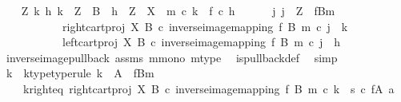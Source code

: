 \begin{isabellebody}
\isanewline
\ \ \isamarkupfalse%
\ {\isachardoublequoteopen}{\isasymAnd}Z\ k\ h{\isachardot}{\kern0pt}\ k\ {\isacharcolon}{\kern0pt}\ Z\ {\isasymrightarrow}\ B\ {\isasymLongrightarrow}\ h\ {\isacharcolon}{\kern0pt}\ Z\ {\isasymrightarrow}\ X\ {\isasymLongrightarrow}\ m\ {\isasymcirc}\isactrlsub c\ k\ {\isacharequal}{\kern0pt}\ f\ {\isasymcirc}\isactrlsub c\ h\ {\isasymLongrightarrow}\isanewline
\ \ \ \ \ {\isacharparenleft}{\kern0pt}{\isasymexists}{\isacharbang}{\kern0pt}j{\isachardot}{\kern0pt}\ j\ {\isacharcolon}{\kern0pt}\ Z\ {\isasymrightarrow}\ f\isactrlsup {\isacharminus}{\kern0pt}B{\isasymrparr}\isactrlbsub m\isactrlesub \ {\isasymand}\isanewline
\ \ \ \ \ \ \ \ \ \ \ {\isacharparenleft}{\kern0pt}right{\isacharunderscore}{\kern0pt}cart{\isacharunderscore}{\kern0pt}proj\ X\ B\ {\isasymcirc}\isactrlsub c\ inverse{\isacharunderscore}{\kern0pt}image{\isacharunderscore}{\kern0pt}mapping\ f\ B\ m{\isacharparenright}{\kern0pt}\ {\isasymcirc}\isactrlsub c\ j\ {\isacharequal}{\kern0pt}\ k\ {\isasymand}\isanewline
\ \ \ \ \ \ \ \ \ \ \ {\isacharparenleft}{\kern0pt}left{\isacharunderscore}{\kern0pt}cart{\isacharunderscore}{\kern0pt}proj\ X\ B\ {\isasymcirc}\isactrlsub c\ inverse{\isacharunderscore}{\kern0pt}image{\isacharunderscore}{\kern0pt}mapping\ f\ B\ m{\isacharparenright}{\kern0pt}\ {\isasymcirc}\isactrlsub c\ j\ {\isacharequal}{\kern0pt}\ h{\isacharparenright}{\kern0pt}{\isachardoublequoteclose}\isanewline
\ \ \ \ \isamarkupfalse%
\ inverse{\isacharunderscore}{\kern0pt}image{\isacharunderscore}{\kern0pt}pullback\ assms{\isacharparenleft}{\kern0pt}{}{\isacharparenright}{\kern0pt}\ m{\isacharunderscore}{\kern0pt}mono\ m{\isacharunderscore}{\kern0pt}type\ \isamarkupfalse%
\ is{\isacharunderscore}{\kern0pt}pullback{\isacharunderscore}{\kern0pt}def\ \isamarkupfalse%
\ simp\isanewline
\ \ \isamarkupfalse%
\ \isamarkupfalse%
\ k\ \ k{\isacharunderscore}{\kern0pt}type{\isacharbrackleft}{\kern0pt}type{\isacharunderscore}{\kern0pt}rule{\isacharbrackright}{\kern0pt}{\isacharcolon}{\kern0pt}\ {\isachardoublequoteopen}k\ {\isacharcolon}{\kern0pt}\ A\ {\isasymrightarrow}\ f\isactrlsup {\isacharminus}{\kern0pt}B{\isasymrparr}\isactrlbsub m\isactrlesub {\isachardoublequoteclose}\ \isanewline
\ \ \ \ k{\isacharunderscore}{\kern0pt}right{\isacharunderscore}{\kern0pt}eq{\isacharcolon}{\kern0pt}\ {\isachardoublequoteopen}{\isacharparenleft}{\kern0pt}right{\isacharunderscore}{\kern0pt}cart{\isacharunderscore}{\kern0pt}proj\ X\ B\ {\isasymcirc}\isactrlsub c\ inverse{\isacharunderscore}{\kern0pt}image{\isacharunderscore}{\kern0pt}mapping\ f\ B\ m{\isacharparenright}{\kern0pt}\ {\isasymcirc}\isactrlsub c\ k\ {\isacharequal}{\kern0pt}\ s\ {\isasymcirc}\isactrlsub c\ f{\isasymrestriction}\isactrlbsub {\isacharparenleft}{\kern0pt}A{\isacharcomma}{\kern0pt}\ a{\isacharparenright}{\kern0pt}\isactrlesub {\isachardoublequoteclose}\ \isanewline

\end{isabellebody}
